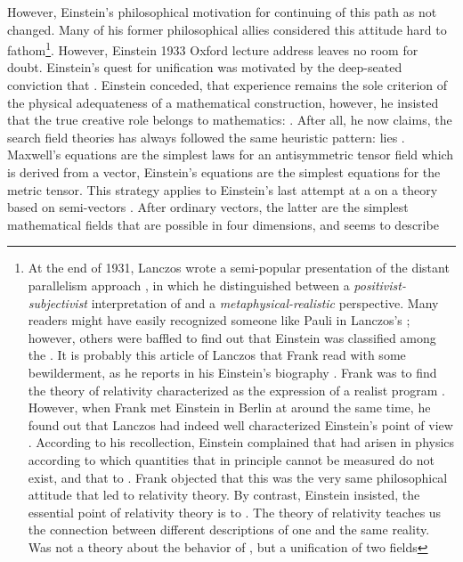 \documentclass[draft]{article}
\begin{document}
However, Einstein's philosophical motivation for continuing of this path as not changed. Many of his former philosophical allies considered this attitude hard to fathom\footnote{At the end of 1931, Lanczos wrote a semi-popular presentation of the distant parallelism approach \citep{Lanczos1931}, in which he distinguished between a \emph{positivist-subjectivist} interpretation of \rt and a \emph{metaphysical-realistic} perspective. Many readers might have easily recognized someone like Pauli in Lanczos's ; however, others were baffled to find out that Einstein was classified among the . It is probably this article of Lanczos that Frank read with some bewilderment, as he reports in his Einstein's biography \citep{Frank1947}. Frank was  to find the theory of relativity characterized as the expression of a realist program  \citep[215]{Frank1947}. However, when Frank met Einstein in Berlin at around the same time, he found out that Lanczos had indeed well characterized Einstein's point of view \citep[215f.]{Frank1947}. According to his recollection, Einstein complained that  had arisen in physics according to which quantities that in principle cannot be measured do not exist, and that to  \citep[216]{Frank1947}. Frank objected that this was the very same philosophical attitude that led to relativity theory. By contrast, Einstein insisted, the essential point of relativity theory is to   \citep[216]{Frank1947}. The theory of relativity teaches us the connection between different descriptions of one and the same reality. Was not a theory about the behavior of \rac, but a unification of two fields}. However, Einstein 1933 Oxford lecture address leaves no room for doubt. Einstein's quest for unification was motivated by the deep-seated conviction that  \citep{Einstein1933}. Einstein conceded, that experience remains the sole criterion of the physical adequateness of a mathematical construction, however, he insisted that the true creative role belongs to mathematics:  \citep[167]{Einstein1933}. After all, he now claims, the search field theories has always followed the same heuristic pattern:  lies  \citep[168]{Einstein1933}. Maxwell's equations are the simplest laws for an antisymmetric tensor field which is derived from a vector, Einstein's equations are the simplest equations for the metric tensor\etc. This strategy applies to Einstein's last attempt at a \uft on a theory based on semi-vectors \citep{Einstein1932c,Einstein1933c,Einstein1934b,Einstein1933d}. After ordinary vectors, the latter are the simplest mathematical fields that are possible in four dimensions, and seems to describe 
\end{document}
